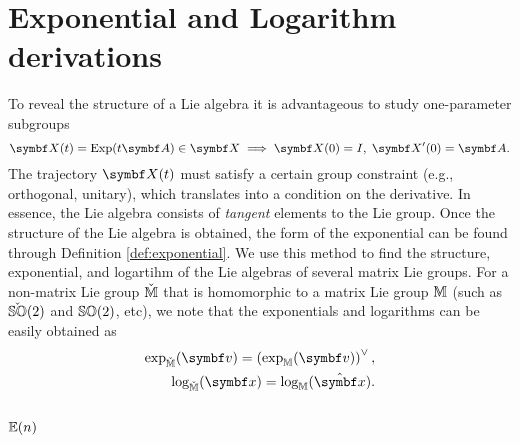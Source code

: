\section{Exponential and Logarithm derivations}

To reveal the structure of a Lie algebra it is advantageous to study one-parameter subgroups
\begin{equation}
  \label{eq:one_parameter_subgroup}
  \X(t) = \Exp(t \A) \in \X \implies \X(0) = I, \; \X'(0) = \A.
\end{equation}
The trajectory $\X(t)$ must satisfy a certain group constraint (e.g., orthogonal, unitary), which translates into a condition on the derivative. In essence, the Lie algebra consists of \emph{tangent} elements to the Lie group. Once the structure of the Lie algebra is obtained, the form of the exponential can be found through Definition \ref{def:exponential}. We use this method to find the structure, exponential, and logartihm of the Lie algebras of several matrix Lie groups. For a non-matrix Lie group $\check{\mathbb{M}}$ that is homomorphic to a matrix Lie group $\mathbb{M}$ (such as $\check{\mathbb{SO}}(2)$ and ${\mathbb{SO}(2)}$, etc), we note that the exponentials and logarithms can be easily obtained as
\begin{subequations}
  \begin{align}
    \exp_{\cM}(\bv) = \left(\exp_{\M}(\bv) \right)^{\vee}, \\
    \log_{\cM}(\x) = \log_{\M} (\hat \x).
  \end{align}
\end{subequations}

\subsection{\texorpdfstring{${\mathbb{E}(n)}$}{E(n)}}

